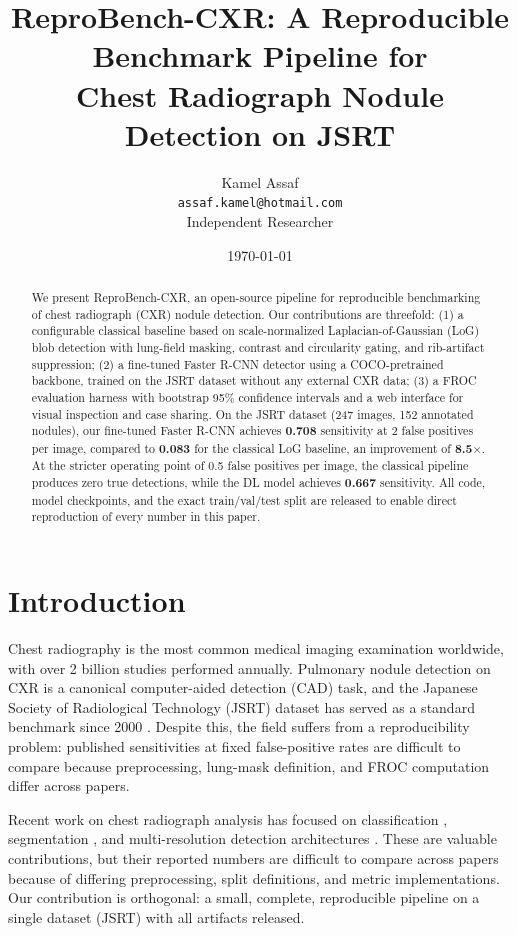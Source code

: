 \documentclass[11pt]{article}
\title{ReproBench-CXR: A Reproducible Benchmark Pipeline for\\
Chest Radiograph Nodule Detection on JSRT}
\author{
  Kamel Assaf \\
  \texttt{assaf.kamel@hotmail.com} \\
  Independent Researcher
}
\date{\today}
\begin{document}
\maketitle

\begin{abstract}
We present ReproBench-CXR, an open-source pipeline for reproducible
benchmarking of chest radiograph (CXR) nodule detection. Our contributions
are threefold: (1) a configurable classical baseline based on scale-normalized
Laplacian-of-Gaussian (LoG) blob detection with lung-field masking, contrast
and circularity gating, and rib-artifact suppression; (2) a fine-tuned Faster
R-CNN detector using a COCO-pretrained backbone, trained on the JSRT dataset
without any external CXR data; (3) a FROC evaluation harness with bootstrap
95\% confidence intervals and a web interface for visual inspection and
case sharing. On the JSRT dataset (247 images, 152 annotated nodules), our
fine-tuned Faster R-CNN achieves \textbf{0.708} sensitivity at 2
false positives per image, compared to \textbf{0.083} for the
classical LoG baseline, an improvement of \textbf{8.5}$\times$. At the
stricter operating point of 0.5 false positives per image, the classical
pipeline produces zero true detections, while the DL model achieves
\textbf{0.667} sensitivity. All code, model checkpoints, and the exact
train/val/test split are released to enable direct reproduction of every
number in this paper.
\end{abstract}

\section{Introduction}

Chest radiography is the most common medical imaging examination worldwide,
with over 2 billion studies performed annually. Pulmonary nodule detection on
CXR is a canonical computer-aided detection (CAD) task, and the Japanese
Society of Radiological Technology (JSRT) dataset has served as a standard
benchmark since 2000 \cite{shiraishi2000jsrt}. Despite this, the field suffers
from a reproducibility problem: published sensitivities at fixed false-positive
rates are difficult to compare because preprocessing, lung-mask definition,
and FROC computation differ across papers.

Recent work on chest radiograph analysis has focused on classification
\cite{habeeb2025modified}, segmentation \cite{thamilarasi2025enhanced},
and multi-resolution detection architectures \cite{li2020multi}. These are
valuable contributions, but their reported numbers are difficult to compare
across papers because of differing preprocessing, split definitions, and
metric implementations. Our contribution is orthogonal: a small, complete,
reproducible pipeline on a single dataset (JSRT) with all artifacts
released.
\end{document}
